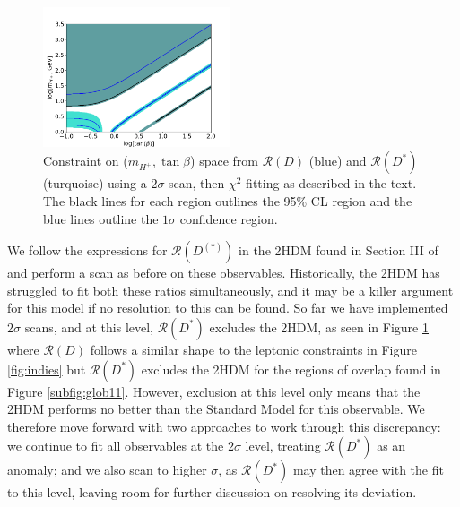 \documentclass[a4paper,12pt]{article}
\begin{document}
\begin{figure}[ht]
    \centering
    \includegraphics[width=0.49\textwidth]{rd_both196sig.png}
    \caption{\label{fig:rds}Constraint on ($m_{H^+},\tan\beta$) space from $\mathcal{R}(D)$ (blue) and $\mathcal{R}(D^*)$ (turquoise) using a $2\sigma$ scan, then $\chi^2$ fitting as described in the text. 
    The black lines for each region outlines the 95\% CL region and the blue lines outline the $1\sigma$ confidence region.}
\end{figure}
We follow the expressions for $\mathcal{R}(D^{(*)})$ in the 2HDM found in Section III of \cite{rds} and perform a scan as before on these observables. 
Historically, the 2HDM has struggled to fit both these ratios simultaneously, and it may be a killer argument for this model if no resolution to this can be found. 
So far we have implemented $2\sigma$ scans, and at this level, $\mathcal{R}(D^*)$ excludes the 2HDM, as seen in Figure \ref{fig:rds} where $\mathcal{R}(D)$ follows a similar shape to the leptonic constraints in Figure \ref{fig:indies} but $\mathcal{R}(D^*)$ excludes the 2HDM for the regions of overlap found in Figure \ref{subfig:glob11}.
However, exclusion at this level only means that the 2HDM performs no better than the Standard Model for this observable. 
We therefore move forward with two approaches to work through this discrepancy: we continue to fit all observables at the $2\sigma$ level, treating $\mathcal{R}(D^*)$ as an anomaly; and we also scan to higher $\sigma$, as $\mathcal{R}(D^*)$ may then agree with the fit to this level, leaving room for further discussion on resolving its deviation.
\end{document}
